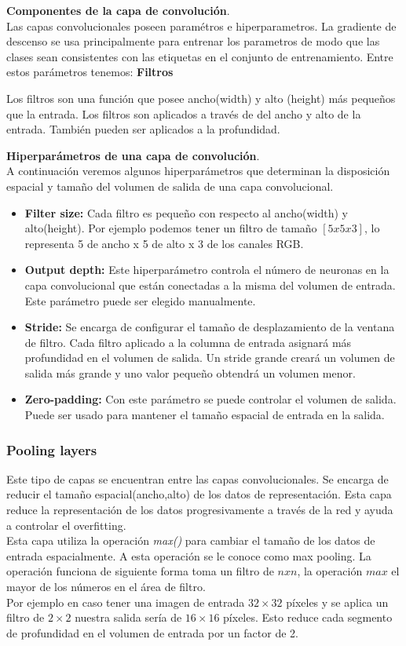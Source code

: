 \textbf{Componentes de la capa de convolución}.\\	
Las capas convolucionales poseen paramétros e hiperparametros. La gradiente de descenso se usa principalmente para entrenar los parametros de modo que las clases sean consistentes con las etiquetas en el conjunto de entrenamiento. Entre estos parámetros tenemos:
\textbf{Filtros}

Los filtros son una función que posee ancho(width) y alto (height) más pequeños que la entrada. Los filtros son aplicados a través de  del ancho y alto de la entrada. También pueden ser aplicados a la profundidad.

\textbf{Hiperparámetros de una capa de convolución}.\\
A continuación veremos algunos hiperparámetros que determinan la disposición espacial y tamaño del volumen de salida de una capa convolucional.
\begin{itemize}
	\item \textbf{Filter size:} Cada filtro es pequeño con respecto al ancho(width) y alto(height). Por ejemplo podemos tener un filtro de tamaño $[5x5x3]$, lo representa 5 de ancho x 5 de alto x 3 de los canales RGB.
	\item \textbf{Output depth:} Este hiperparámetro controla el número de neuronas en la capa convolucional que están conectadas a la misma del volumen de entrada. Este parámetro puede ser elegido manualmente.
	\item \textbf{Stride:} Se encarga de configurar el tamaño de desplazamiento de la ventana de filtro. Cada filtro aplicado a la columna de entrada asignará más profundidad en el volumen de salida. Un stride grande creará un volumen de salida más grande y uno valor pequeño obtendrá un volumen menor.
	\item \textbf{Zero-padding:} Con este parámetro se puede controlar el volumen de salida. Puede ser usado para mantener el tamaño espacial de entrada en la salida. 
\end{itemize}

\subsubsection{Pooling layers}
Este tipo de capas se encuentran entre las capas convolucionales. Se encarga de reducir el tamaño espacial(ancho,alto) de los datos de representación. Esta capa reduce la representación de los datos progresivamente a través de la red y ayuda a controlar el overfitting.\\
Esta capa utiliza la operación \textit{max()} para cambiar el tamaño de los datos de entrada espacialmente. A esta operación se le conoce como max pooling. La operación funciona de siguiente forma toma un filtro de $n x n$, la operación $max$ el mayor de los números en el área de filtro.\\ Por ejemplo en caso tener una imagen de entrada $32 \times 32$ píxeles y se aplica un filtro de $2\times2$  nuestra salida sería de $16\times16$ píxeles. Esto reduce cada segmento de profundidad en el volumen de entrada por un factor de 2.

